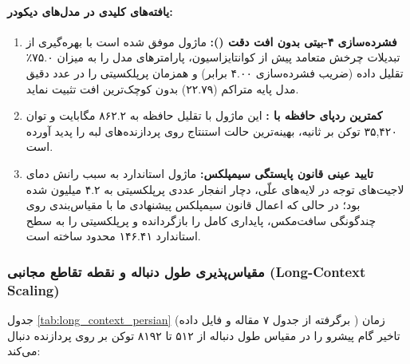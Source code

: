 \paragraph{یافته‌های کلیدی در مدل‌های دیکودر:}
\begin{enumerate}
    \item \textbf{فشرده‌سازی ۴-بیتی بدون افت دقت ():} ماژول  موفق شده است با بهره‌گیری از تبدیلات چرخش متعامد پیش از کوانتایزاسیون، پارامترهای مدل را به میزان ۷۵.۰٪ تقلیل داده (ضریب فشرده‌سازی ۴.۰۰ برابر) و همزمان پرپلکسیتی را در عدد دقیق مدل پایه متراکم (۲۲.۷۹) بدون کوچک‌ترین افت تثبیت نماید.
    \item \textbf{کمترین ردپای حافظه با :} این ماژول با تقلیل حافظه به ۸۶۲.۲ مگابایت و توان ۳۵,۴۲۰ توکن بر ثانیه، بهینه‌ترین حالت استنتاج روی پردازنده‌های لبه را پدید آورده است.
    \item \textbf{تایید عینی قانون پایستگی سیمپلکس:} ماژول  استاندارد به سبب رانش دمای لاجیت‌های توجه در لایه‌های علّی، دچار انفجار عددی پرپلکسیتی به ۴.۲ میلیون شده بود؛ در حالی که اعمال قانون سیمپلکس پیشنهادی ما با مقیاس‌بندی روی چندگونگی سافت‌مکس، پایداری کامل را بازگردانده و پرپلکسیتی را به سطح استاندارد ۱۴۶.۴۱ محدود ساخته است.
\end{enumerate}

\subsubsection{مقیاس‌پذیری طول دنباله و نقطه تقاطع مجانبی (Long-Context Scaling)}
جدول \ref{tab:long_context_persian} (برگرفته از جدول ۷ مقاله و فایل داده ) زمان تاخیر گام پیشرو را در مقیاس طول دنباله از ۵۱۲ تا ۸۱۹۲ توکن بر روی پردازنده  دنبال می‌کند:

